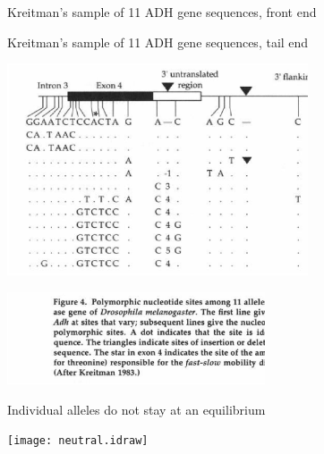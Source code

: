 \documentclass[bluish,slideColor,colorBG]{prosper}
\begin{document}
{\begin{slide}[Replace]{Kreitman's sample of 11 ADH gene sequences, front end}
\end{slide}

\begin{slide}[Replace]{Kreitman's sample of 11 ADH gene sequences, tail end}

\noindent
\centerline{\includegraphics[width=3.5in]{kreitmanexpt2.ps}}
\centerline{\includegraphics[width=3in]{kreitmanexpt3.ps}}

\end{slide}

\begin{slide}[Replace]{Individual alleles do not stay at an equilibrium}
\bigskip

\centerline{\texttt{[image: neutral.idraw]}}

\end{slide}
}
\end{document}
